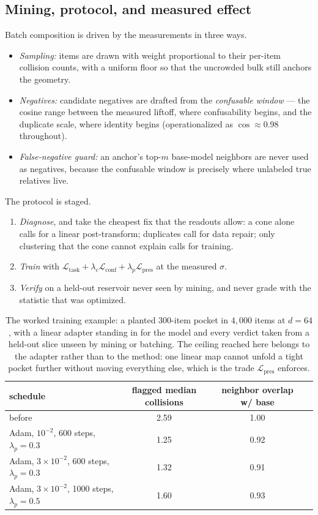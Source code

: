\documentclass[11pt,letterpaper]{article}
\begin{document}
\subsection{Mining, protocol, and measured effect}

Batch composition is driven by the measurements in three ways.
\begin{itemize}
\item \emph{Sampling:} items are drawn with weight proportional to
  their per-item collision counts, with a uniform floor so that the
  uncrowded bulk still anchors the geometry.
\item \emph{Negatives:} candidate negatives are drafted from the
  \emph{confusable window} --- the cosine range between the measured
  liftoff, where confusability begins, and the duplicate scale, where
  identity begins (operationalized as $\cos \approx 0.98$ throughout).
\item \emph{False-negative guard:} an anchor's top-$m$ base-model
  neighbors are never used as negatives, because the confusable window
  is precisely where unlabeled true relatives live.
\end{itemize} The protocol is staged.
\begin{enumerate}
\item \emph{Diagnose}, and take the cheapest fix that the readouts
  allow: a cone alone calls for a linear post-transform; duplicates call
  for data repair; only clustering that the cone cannot explain calls
  for training.
\item \emph{Train} with $\mathcal L_{\mathrm{task}} + \lambda_c
  \mathcal L_{\mathrm{conf}} + \lambda_p \mathcal L_{\mathrm{pres}}$
  at the measured $\sigma$.
\item \emph{Verify} on a held-out reservoir never seen by mining, and
  never grade with the statistic that was optimized.
\end{enumerate}

\begin{table}[t]
\centering
\caption{The worked training example: a planted $300$-item pocket in
$4{,}000$ items at $d = 64$, with a linear adapter standing in for the
model and every verdict taken from a held-out slice unseen by mining or
batching. The ceiling reached here belongs to the adapter rather than to the
method: one linear map cannot unfold a tight pocket further without moving
everything else, which is the trade $\mathcal L_{\mathrm{pres}}$
enforces.}
\label{tab:training}
\small
\begin{tabular}{lccc}
\toprule
schedule & flagged median collisions & neighbor overlap w/ base\\
\midrule
before & 2.59 & 1.00\\
Adam, $10^{-2}$, 600 steps, $\lambda_p{=}0.3$ & 1.25 & 0.92\\
Adam, $3{\times}10^{-2}$, 600 steps, $\lambda_p{=}0.3$ & 1.32 & 0.91\\
Adam, $3{\times}10^{-2}$, 1000 steps, $\lambda_p{=}0.5$ & 1.60 & 0.93\\
\bottomrule
\end{tabular}
\end{table}
\end{document}
